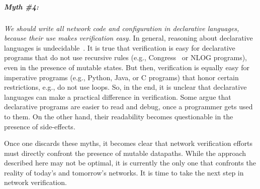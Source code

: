 \subparagraph*{Myth \#4:} \emph{We should write all network code and configuration in declarative languages, because their use makes verification easy.} In general, reasoning about declarative languages is undecidable~\cite{Halevy}. It is true that verification is easy for declarative programs that do not use recursive rules (e.g., Congress~\cite{congress} or NLOG programs), even in the presence of mutable states. But then, verification is equally easy for imperative programs (e.g., Python, Java, or C programs) that honor certain restrictions, e.g., do not use loops. So, in the end, it is unclear that declarative languages can make a practical difference in verification. Some argue that declarative programs are easier to read and debug, once a programmer gets used to them. On the other hand, their readability becomes questionable in the presence of side-effects.


Once one discards these myths, it becomes clear that network verification efforts must directly confront the presence of mutable datapaths. While the approach described here may not be optimal, it is currently the only one that confronts the reality of today's and tomorrow's networks. It is time to take the next step in network verification.


